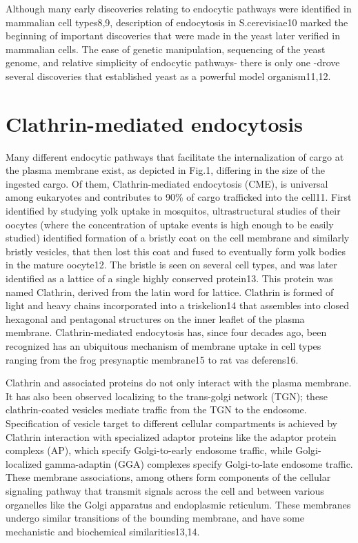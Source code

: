 \vspace{5mm}
Although many early discoveries relating to endocytic pathways were identified in mammalian cell types8,9, description of endocytosis in S.cerevisiae10 marked the beginning of important discoveries that were made in the yeast later verified in mammalian cells. The ease of genetic manipulation, sequencing of the yeast genome, and relative simplicity of endocytic pathways- there is only one -drove several discoveries that established yeast as a powerful model organism11,12.






\section{Clathrin-mediated endocytosis}
Many different endocytic pathways that facilitate the internalization of cargo at the plasma membrane exist, as depicted in Fig.1, differing in the size of the ingested cargo. Of them, Clathrin-mediated endocytosis (CME), is universal among eukaryotes and contributes to 90\% of cargo trafficked into the cell11. First identified by studying yolk uptake in mosquitos, ultrastructural studies of their oocytes (where the concentration of uptake events is high enough to be easily studied) identified formation of a bristly coat on the cell membrane and similarly bristly vesicles, that then lost this coat and fused to eventually form yolk bodies in the mature oocyte12. The bristle is seen on several cell types, and was later identified as a lattice of a single highly conserved protein13. This protein was named Clathrin, derived from the latin word for lattice. Clathrin is formed of light and heavy chains incorporated into a triskelion14 that assembles into closed hexagonal and pentagonal structures on the inner leaflet of the plasma membrane. Clathrin-mediated endocytosis has, since four decades ago, been recognized has an ubiquitous mechanism of membrane uptake in cell types ranging from the frog presynaptic membrane15 to rat vas deferens16. 

\vspace{5mm}
Clathrin and associated proteins do not only interact with the plasma membrane. It has also been observed localizing to the trans-golgi network (TGN); these clathrin-coated vesicles mediate traffic from the TGN to the endosome. Specification of vesicle target to different cellular compartments is achieved by Clathrin interaction with specialized adaptor proteins like the adaptor protein complexs (AP), which specify Golgi-to-early endosome traffic, while Golgi-localized gamma-adaptin (GGA) complexes specify Golgi-to-late endosome traffic. These membrane associations, among others form components of the cellular signaling pathway that transmit signals across the cell and between various organelles like the Golgi apparatus and endoplasmic reticulum. These membranes undergo similar transitions of the bounding membrane, and have some mechanistic and biochemical similarities13,14. 

